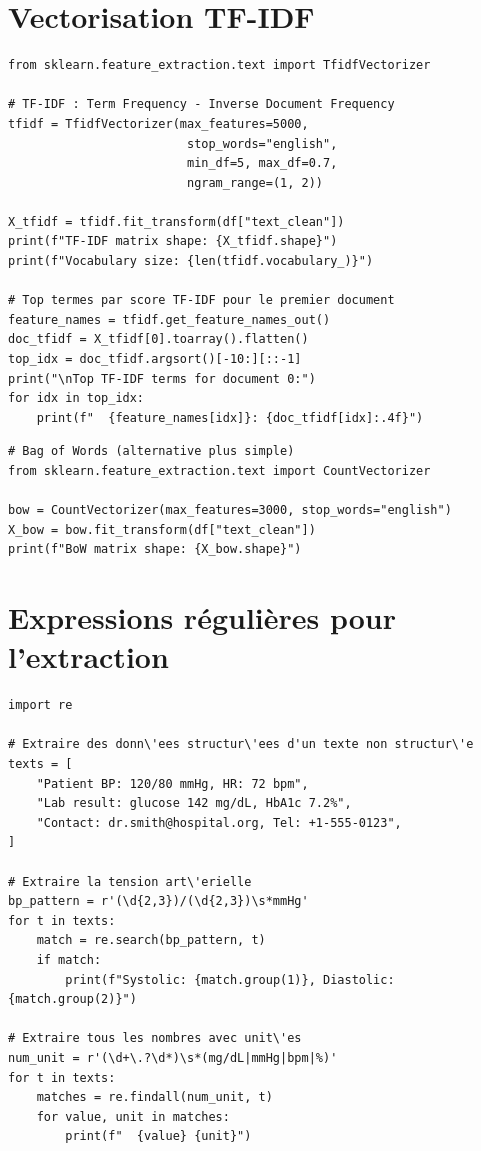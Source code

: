\section{Vectorisation TF-IDF}

\begin{verbatim}
from sklearn.feature_extraction.text import TfidfVectorizer

# TF-IDF : Term Frequency - Inverse Document Frequency
tfidf = TfidfVectorizer(max_features=5000,
                         stop_words="english",
                         min_df=5, max_df=0.7,
                         ngram_range=(1, 2))

X_tfidf = tfidf.fit_transform(df["text_clean"])
print(f"TF-IDF matrix shape: {X_tfidf.shape}")
print(f"Vocabulary size: {len(tfidf.vocabulary_)}")

# Top termes par score TF-IDF pour le premier document
feature_names = tfidf.get_feature_names_out()
doc_tfidf = X_tfidf[0].toarray().flatten()
top_idx = doc_tfidf.argsort()[-10:][::-1]
print("\nTop TF-IDF terms for document 0:")
for idx in top_idx:
    print(f"  {feature_names[idx]}: {doc_tfidf[idx]:.4f}")
\end{verbatim}

\begin{verbatim}
# Bag of Words (alternative plus simple)
from sklearn.feature_extraction.text import CountVectorizer

bow = CountVectorizer(max_features=3000, stop_words="english")
X_bow = bow.fit_transform(df["text_clean"])
print(f"BoW matrix shape: {X_bow.shape}")
\end{verbatim}

\section{Expressions r\'eguli\`eres pour l'extraction}

\begin{verbatim}
import re

# Extraire des donn\'ees structur\'ees d'un texte non structur\'e
texts = [
    "Patient BP: 120/80 mmHg, HR: 72 bpm",
    "Lab result: glucose 142 mg/dL, HbA1c 7.2%",
    "Contact: dr.smith@hospital.org, Tel: +1-555-0123",
]

# Extraire la tension art\'erielle
bp_pattern = r'(\d{2,3})/(\d{2,3})\s*mmHg'
for t in texts:
    match = re.search(bp_pattern, t)
    if match:
        print(f"Systolic: {match.group(1)}, Diastolic: {match.group(2)}")

# Extraire tous les nombres avec unit\'es
num_unit = r'(\d+\.?\d*)\s*(mg/dL|mmHg|bpm|%)'
for t in texts:
    matches = re.findall(num_unit, t)
    for value, unit in matches:
        print(f"  {value} {unit}")
\end{verbatim}

